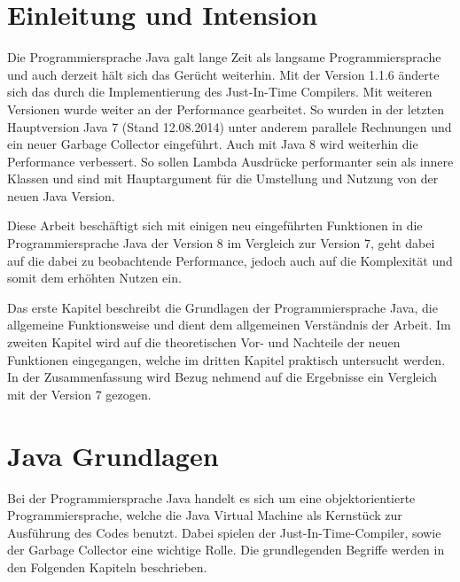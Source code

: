 
\chapter{Einleitung und Intension}
\label{sec:EinleitungUndIntension}
Die Programmiersprache Java galt lange Zeit als langsame Programmiersprache und
auch derzeit hält sich das Gerücht weiterhin.
Mit der Version 1.1.6 änderte sich das durch die Implementierung des
Just-In-Time Compilers\cite{symantec:symantec}.
Mit weiteren Versionen wurde weiter an der Performance gearbeitet. So wurden in
der letzten Hauptversion Java 7 (Stand 12.08.2014) unter anderem parallele
Rechnungen\cite{goetz:IBM} und ein neuer Garbage Collector
eingeführt\cite{humble:infoq}.
Auch mit Java 8 wird weiterhin die Performance verbessert\cite{gallardo:oracle}.
So sollen Lambda Ausdrücke performanter sein als innere Klassen und sind mit Hauptargument für
die Umstellung und Nutzung von der neuen Java Version.
 
Diese Arbeit beschäftigt sich mit einigen neu eingeführten Funktionen in die
Programmiersprache Java der Version 8 im Vergleich zur Version 7, geht dabei
auf die dabei zu beobachtende Performance, jedoch auch auf die Komplexität und
somit dem erhöhten Nutzen ein.
 
Das erste Kapitel beschreibt die Grundlagen der Programmiersprache
Java, die allgemeine Funktionsweise und dient dem allgemeinen Verständnis der
Arbeit.
Im zweiten Kapitel wird auf die theoretischen Vor- und Nachteile der neuen
Funktionen eingegangen, welche im dritten Kapitel praktisch untersucht werden.
In der Zusammenfassung wird Bezug nehmend auf die Ergebnisse ein Vergleich mit
der Version 7 gezogen.
 
\chapter{Java Grundlagen}
\label{sec:Grundlagen}
Bei der Programmiersprache Java handelt es sich um eine objektorientierte
Programmiersprache, welche die Java Virtual Machine als Kernstück zur Ausführung
des Codes benutzt. Dabei spielen der Just-In-Time-Compiler, sowie der Garbage
Collector eine wichtige Rolle. Die grundlegenden Begriffe werden in den
Folgenden Kapiteln beschrieben.

